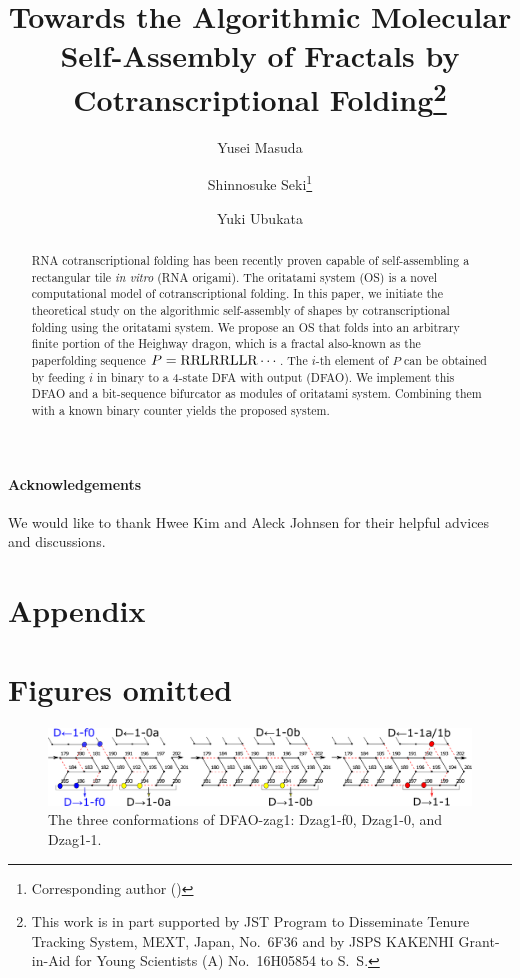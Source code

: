 \documentclass[dvipdfmx,runningheads]{llncs}
\title{Towards the Algorithmic Molecular Self-Assembly of Fractals by Cotranscriptional Folding\thanks{This work is in part supported by JST Program to Disseminate Tenure Tracking System, MEXT, Japan, No.~6F36 and by JSPS KAKENHI Grant-in-Aid for Young Scientists (A) No.~16H05854 to S.~S.}}
\author{
Yusei Masuda \and 
Shinnosuke Seki\thanks{Corresponding author (\email{s.seki@uec.ac.jp})} \and 
Yuki Ubukata
}
\institute{
Department of Computer and Network Engineering, 
The University of Electro-Communications, 
1-5-1, Chofugaoka, Chofu, Tokyo, 1828585, Japan 
}
\begin{document}
\maketitle

\begin{abstract}
RNA cotranscriptional folding has been recently proven capable of self-assembling a rectangular tile \textit{in vitro} (RNA origami). 
The oritatami system (OS) is a novel computational model of cotranscriptional folding. 
In this paper, we initiate the theoretical study on the algorithmic self-assembly of shapes by cotranscriptional folding using the oritatami system. 
We propose an OS that folds into an arbitrary finite portion of the Heighway dragon, which is a fractal also-known as the paperfolding sequence $P = {\rm RRLRRLLR} \cdots$. 
The $i$-th element of $P$ can be obtained by feeding $i$ in binary to a 4-state DFA with output (DFAO). 
We implement this DFAO and a bit-sequence bifurcator as modules of oritatami system. 
Combining them with a known binary counter yields the proposed system. 
\end{abstract}







	\paragraph{\bf Acknowledgements}
%
We would like to thank Hwee Kim and Aleck Johnsen for their helpful advices and discussions.

	
	

	\newpage
	\appendix
	\section*{Appendix}

\section{Figures omitted}

\begin{figure}[h]
  \includegraphics[width=\linewidth]{pic/DFAO-zag1.png}
  \caption{The three conformations of DFAO-zag1: Dzag1-f0, Dzag1-0, and Dzag1-1.}
  \label{fig:DFAO-zag1}
\end{figure} 
\end{document}
